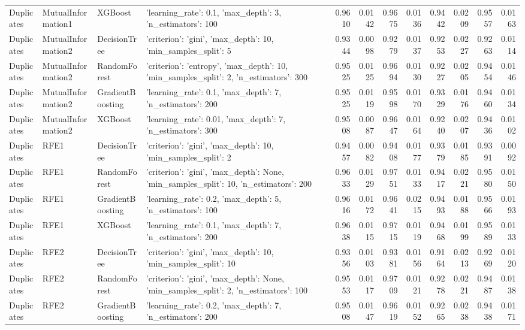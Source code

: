 \begin{tabular}{llllrrrrrrrr}
Duplicates & MutualInformation1 & XGBoost & {'learning_rate': 0.1, 'max_depth': 3, 'n_estimators': 100} & 0.9610 & 0.0142 & 0.9675 & 0.0136 & 0.9442 & 0.0209 & 0.9557 & 0.0163 \\
Duplicates & MutualInformation2 & DecisionTree & {'criterion': 'gini', 'max_depth': 10, 'min_samples_split': 5} & 0.9344 & 0.0098 & 0.9279 & 0.0137 & 0.9253 & 0.0227 & 0.9263 & 0.0114 \\
Duplicates & MutualInformation2 & RandomForest & {'criterion': 'entropy', 'max_depth': 10, 'min_samples_split': 2, 'n_estimators': 300} & 0.9525 & 0.0125 & 0.9694 & 0.0130 & 0.9227 & 0.0205 & 0.9454 & 0.0146 \\
Duplicates & MutualInformation2 & GradientBoosting & {'learning_rate': 0.1, 'max_depth': 7, 'n_estimators': 200} & 0.9525 & 0.0119 & 0.9598 & 0.0170 & 0.9329 & 0.0176 & 0.9460 & 0.0134 \\
Duplicates & MutualInformation2 & XGBoost & {'learning_rate': 0.01, 'max_depth': 7, 'n_estimators': 300} & 0.9508 & 0.0087 & 0.9647 & 0.0164 & 0.9240 & 0.0207 & 0.9436 & 0.0102 \\
Duplicates & RFE1 & DecisionTree & {'criterion': 'gini', 'max_depth': 10, 'min_samples_split': 2} & 0.9457 & 0.0082 & 0.9408 & 0.0177 & 0.9379 & 0.0185 & 0.9391 & 0.0092 \\
Duplicates & RFE1 & RandomForest & {'criterion': 'gini', 'max_depth': None, 'min_samples_split': 10, 'n_estimators': 200} & 0.9633 & 0.0129 & 0.9751 & 0.0133 & 0.9417 & 0.0221 & 0.9580 & 0.0150 \\
Duplicates & RFE1 & GradientBoosting & {'learning_rate': 0.2, 'max_depth': 5, 'n_estimators': 100} & 0.9616 & 0.0172 & 0.9641 & 0.0215 & 0.9493 & 0.0188 & 0.9566 & 0.0193 \\
Duplicates & RFE1 & XGBoost & {'learning_rate': 0.1, 'max_depth': 7, 'n_estimators': 200} & 0.9638 & 0.0115 & 0.9715 & 0.0119 & 0.9468 & 0.0199 & 0.9589 & 0.0133 \\
Duplicates & RFE2 & DecisionTree & {'criterion': 'gini', 'max_depth': 10, 'min_samples_split': 10} & 0.9356 & 0.0103 & 0.9381 & 0.0156 & 0.9164 & 0.0213 & 0.9269 & 0.0120 \\
Duplicates & RFE2 & RandomForest & {'criterion': 'gini', 'max_depth': None, 'min_samples_split': 2, 'n_estimators': 100} & 0.9553 & 0.0117 & 0.9709 & 0.0121 & 0.9278 & 0.0221 & 0.9487 & 0.0138 \\
Duplicates & RFE2 & GradientBoosting & {'learning_rate': 0.2, 'max_depth': 7, 'n_estimators': 200} & 0.9508 & 0.0147 & 0.9619 & 0.0152 & 0.9265 & 0.0238 & 0.9438 & 0.0171 \\

\end{tabular}

